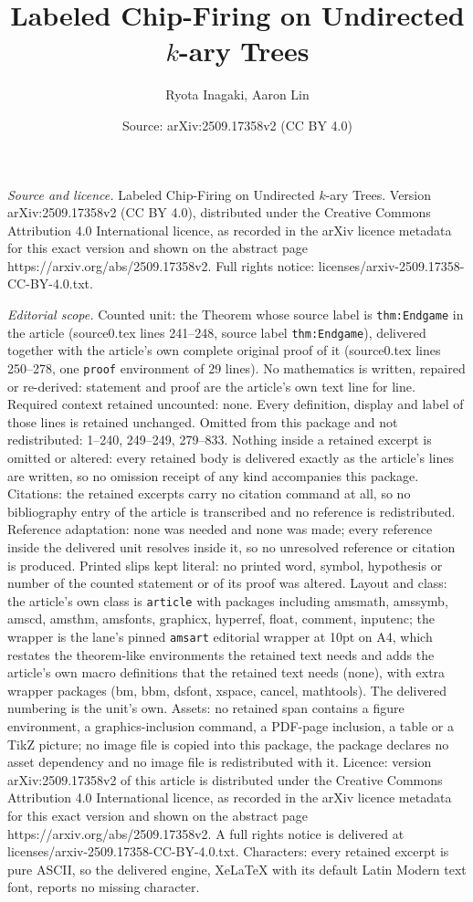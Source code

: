 \documentclass[10pt,a4paper]{amsart}
\title[Labeled Chip-Firing on Undirected $k$-ary Trees]{Labeled Chip-Firing on Undirected $k$-ary Trees}
\author{Ryota Inagaki, Aaron Lin}
\date{Source: arXiv:2509.17358v2 (CC BY 4.0)}
\begin{document}
\maketitle

\noindent\emph{Source and licence.} Labeled Chip-Firing on Undirected $k$-ary Trees. Version arXiv:2509.17358v2 (CC BY 4.0), distributed under the Creative Commons Attribution 4.0 International licence, as recorded in the arXiv licence metadata for this exact version and shown on the abstract page https://arxiv.org/abs/2509.17358v2. Full rights notice: licenses/arxiv-2509.17358-CC-BY-4.0.txt.\par\smallskip

\noindent\textit{Editorial scope.} Counted unit: the Theorem whose source label is \texttt{thm:Endgame} in the article (source0.tex lines 241--248, source label \texttt{thm:Endgame}), delivered together with the article's own complete original proof of it (source0.tex lines 250--278, one \texttt{proof} environment of 29 lines). No mathematics is written, repaired or re-derived: statement and proof are the article's own text line for line. Required context retained uncounted: none. Every definition, display and label of those lines is retained unchanged. Omitted from this package and not redistributed: 1--240, 249--249, 279--833. Nothing inside a retained excerpt is omitted or altered: every retained body is delivered exactly as the article's lines are written, so no omission receipt of any kind accompanies this package. Citations: the retained excerpts carry no citation command at all, so no bibliography entry of the article is transcribed and no reference is redistributed. Reference adaptation: none was needed and none was made; every reference inside the delivered unit resolves inside it, so no unresolved reference or citation is produced. Printed slips kept literal: no printed word, symbol, hypothesis or number of the counted statement or of its proof was altered. Layout and class: the article's own class is \texttt{article} with packages including amsmath, amssymb, amscd, amsthm, amsfonts, graphicx, hyperref, float, comment, inputenc; the wrapper is the lane's pinned \texttt{amsart} editorial wrapper at 10pt on A4, which restates the theorem-like environments the retained text needs and adds the article's own macro definitions that the retained text needs (none), with extra wrapper packages (bm, bbm, dsfont, xspace, cancel, mathtools). The delivered numbering is the unit's own. Assets: no retained span contains a figure environment, a graphics-inclusion command, a PDF-page inclusion, a table or a TikZ picture; no image file is copied into this package, the package declares no asset dependency and no image file is redistributed with it. Licence: version arXiv:2509.17358v2 of this article is distributed under the Creative Commons Attribution 4.0 International licence, as recorded in the arXiv licence metadata for this exact version and shown on the abstract page https://arxiv.org/abs/2509.17358v2. A full rights notice is delivered at licenses/arxiv-2509.17358-CC-BY-4.0.txt. Characters: every retained excerpt is pure ASCII, so the delivered engine, XeLaTeX with its default Latin Modern text font, reports no missing character.
\end{document}
